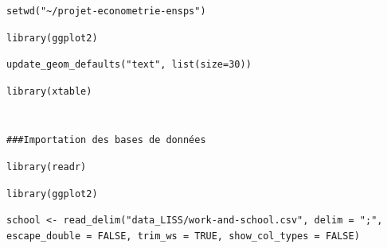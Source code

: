 \documentclass[a4paper, french, 11 pt]{article}\usepackage[]{graphicx}\usepackage[]{xcolor}
\makeatletter
\newenvironment{kframe}{%
 \def\at@end@of@kframe{}%
 \ifinner\ifhmode%
  \def\at@end@of@kframe{\end{minipage}}%
  \begin{minipage}{\columnwidth}%
 \fi\fi%
 \def\FrameCommand##1{\hskip\@totalleftmargin \hskip-\fboxsep
 \colorbox{shadecolor}{##1}\hskip-\fboxsep
     \hskip-\linewidth \hskip-\@totalleftmargin \hskip\columnwidth}%
 \MakeFramed {\advance\hsize-\width
   \@totalleftmargin\z@ \linewidth\hsize
   \@setminipage}}%
 {\par\unskip\endMakeFramed%
 \at@end@of@kframe}
\newenvironment{knitrout}{}{} %
\makeatother
\begin{document}
\begin{knitrout}
\begin{kframe}
\begin{lstlisting}[basicstyle=\ttfamily,breaklines=true]
setwd("~/projet-econometrie-ensps")\end{lstlisting}
\begin{lstlisting}[basicstyle=\ttfamily,breaklines=true]
library(ggplot2)\end{lstlisting}
\begin{lstlisting}[basicstyle=\ttfamily,breaklines=true]
update_geom_defaults("text", list(size=30))\end{lstlisting}
\begin{lstlisting}[basicstyle=\ttfamily,breaklines=true]
library(xtable)\end{lstlisting}
\begin{lstlisting}[basicstyle=\ttfamily,breaklines=true]
                     \end{lstlisting}
\begin{lstlisting}[basicstyle=\ttfamily,breaklines=true]
                     \end{lstlisting}
\begin{lstlisting}[basicstyle=\ttfamily,breaklines=true]
###Importation des bases de données\end{lstlisting}
\begin{lstlisting}[basicstyle=\ttfamily,breaklines=true]
library(readr)\end{lstlisting}
\begin{lstlisting}[basicstyle=\ttfamily,breaklines=true]
library(ggplot2)\end{lstlisting}
\begin{lstlisting}[basicstyle=\ttfamily,breaklines=true]
school <- read_delim("data_LISS/work-and-school.csv", delim = ";", escape_double = FALSE, trim_ws = TRUE, show_col_types = FALSE)\end{lstlisting}



\end{kframe}
\end{knitrout}
\end{document}
